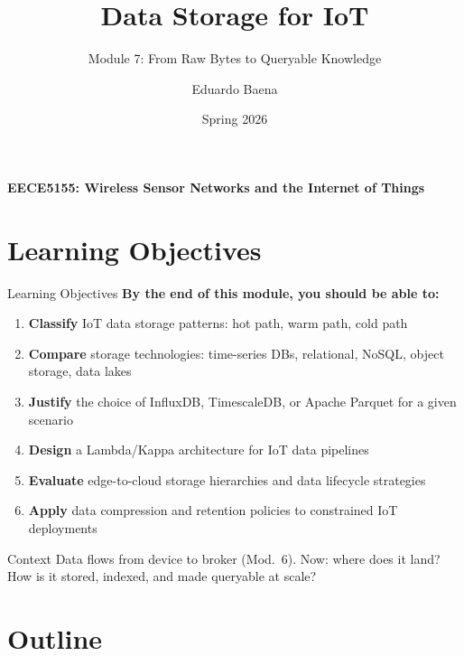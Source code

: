 \documentclass[aspectratio=169,11pt]{beamer}
\title[EECE5155 -- Module 7]{Data Storage for IoT}
\subtitle{Module 7: From Raw Bytes to Queryable Knowledge}
\author{Eduardo Baena}
\date{Spring 2026}
\institute{Northeastern University\\Department of Electrical and Computer Engineering\\
\texttt{e.baena@northeastern.edu}}
\begin{document}
\begin{frame}
    \titlepage
    \vspace{-1cm}
    \begin{center}
        \textbf{EECE5155: Wireless Sensor Networks and the Internet of Things}
    \end{center}
\end{frame}

\section{Learning Objectives}

\begin{frame}{Learning Objectives}
    \textbf{By the end of this module, you should be able to:}

    \vspace{0.2cm}
    \begin{enumerate}
        \item \textbf{Classify} IoT data storage patterns: hot path, warm path, cold path
        \item \textbf{Compare} storage technologies: time-series DBs, relational, NoSQL, object storage, data lakes
        \item \textbf{Justify} the choice of InfluxDB, TimescaleDB, or Apache Parquet for a given scenario
        \item \textbf{Design} a Lambda/Kappa architecture for IoT data pipelines
        \item \textbf{Evaluate} edge-to-cloud storage hierarchies and data lifecycle strategies
        \item \textbf{Apply} data compression and retention policies to constrained IoT deployments
    \end{enumerate}

    \vspace{0.1cm}
    \begin{alertblock}{Context}
        Data flows from device to broker (Mod.\ 6). Now: where does it land? How is it stored, indexed, and made queryable at scale?
    \end{alertblock}
\end{frame}

\section{Outline}
\end{document}
